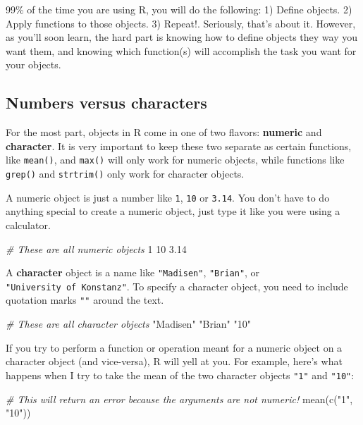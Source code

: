\documentclass[
]{book}
\newenvironment{Shaded}{\begin{snugshade}}{\end{snugshade}}
\newcommand{\CommentTok}[1]{\textcolor[rgb]{0.56,0.35,0.01}{\textit{#1}}}
\newcommand{\DecValTok}[1]{\textcolor[rgb]{0.00,0.00,0.81}{#1}}
\newcommand{\FloatTok}[1]{\textcolor[rgb]{0.00,0.00,0.81}{#1}}
\newcommand{\FunctionTok}[1]{\textcolor[rgb]{0.00,0.00,0.00}{#1}}
\newcommand{\NormalTok}[1]{#1}
\newcommand{\StringTok}[1]{\textcolor[rgb]{0.31,0.60,0.02}{#1}}
\begin{document}
99\% of the time you are using R, you will do the following: 1) Define objects. 2) Apply functions to those objects. 3) Repeat!. Seriously, that's about it. However, as you'll soon learn, the hard part is knowing how to define objects they way you want them, and knowing which function(s) will accomplish the task you want for your objects.

\hypertarget{BASIC-TYPES}{%
\subsection{Numbers versus characters}\label{BASIC-TYPES}}

For the most part, objects in R come in one of two flavors: \textbf{numeric} and \textbf{character}. It is very important to keep these two separate as certain functions, like \texttt{mean()}, and \texttt{max()} will only work for numeric objects, while functions like \texttt{grep()} and \texttt{strtrim()} only work for character objects.

A numeric object is just a number like \texttt{1}, \texttt{10} or \texttt{3.14}. You don't have to do anything special to create a numeric object, just type it like you were using a calculator.

\begin{Shaded}
\begin{Highlighting}[]
\CommentTok{\# These are all numeric objects}
\DecValTok{1}
\DecValTok{10}
\FloatTok{3.14}
\end{Highlighting}
\end{Shaded}

A \textbf{character} object is a name like \texttt{"Madisen"}, \texttt{"Brian"}, or \texttt{"University\ of\ Konstanz"}. To specify a character object, you need to include quotation marks \texttt{""} around the text.

\begin{Shaded}
\begin{Highlighting}[]
\CommentTok{\# These are all character objects}
\StringTok{"Madisen"}
\StringTok{"Brian"}
\StringTok{"10"}
\end{Highlighting}
\end{Shaded}

If you try to perform a function or operation meant for a numeric object on a character object (and vice-versa), R will yell at you. For example, here's what happens when I try to take the mean of the two character objects \texttt{"1"} and \texttt{"10"}:

\begin{Shaded}
\begin{Highlighting}[]
\CommentTok{\# This will return an error because the arguments are not numeric!}
\FunctionTok{mean}\NormalTok{(}\FunctionTok{c}\NormalTok{(}\StringTok{"1"}\NormalTok{, }\StringTok{"10"}\NormalTok{))}
\end{Highlighting}
\end{Shaded}
\end{document}
